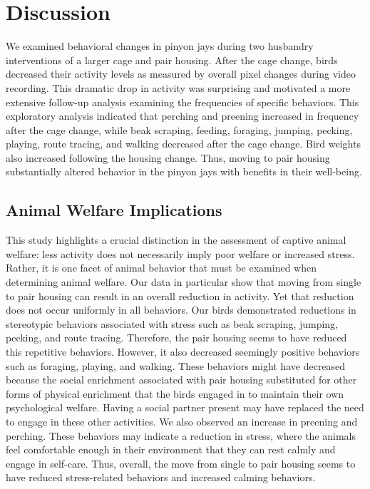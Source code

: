 \documentclass[
  pub]{apa6}
\begin{document}
\hypertarget{discussion}{%
\section{Discussion}\label{discussion}}

We examined behavioral changes in pinyon jays during two husbandry interventions of a larger cage and pair housing. After the cage change, birds decreased their activity levels as measured by overall pixel changes during video recording. This dramatic drop in activity was surprising and motivated a more extensive follow-up analysis examining the frequencies of specific behaviors. This exploratory analysis indicated that perching and preening increased in frequency after the cage change, while beak scraping, feeding, foraging, jumping, pecking, playing, route tracing, and walking decreased after the cage change. Bird weights also increased following the housing change. Thus, moving to pair housing substantially altered behavior in the pinyon jays with benefits in their well-being.

\hypertarget{animal-welfare-implications}{%
\subsection{Animal Welfare Implications}\label{animal-welfare-implications}}

This study highlights a crucial distinction in the assessment of captive animal welfare: less activity does not necessarily imply poor welfare or increased stress. Rather, it is one facet of animal behavior that must be examined when determining animal welfare. Our data in particular show that moving from single to pair housing can result in an overall reduction in activity. Yet that reduction does not occur uniformly in all behaviors. Our birds demonstrated reductions in stereotypic behaviors associated with stress such as beak scraping, jumping, pecking, and route tracing. Therefore, the pair housing seems to have reduced this repetitive behaviors. However, it also decreased seemingly positive behaviors such as foraging, playing, and walking. These behaviors might have decreased because the social enrichment associated with pair housing substituted for other forms of physical enrichment that the birds engaged in to maintain their own psychological welfare. Having a social partner present may have replaced the need to engage in these other activities. We also observed an increase in preening and perching. These behaviors may indicate a reduction in stress, where the animals feel comfortable enough in their environment that they can rest calmly and engage in self-care. Thus, overall, the move from single to pair housing seems to have reduced stress-related behaviors and increased calming behaviors.
\end{document}
